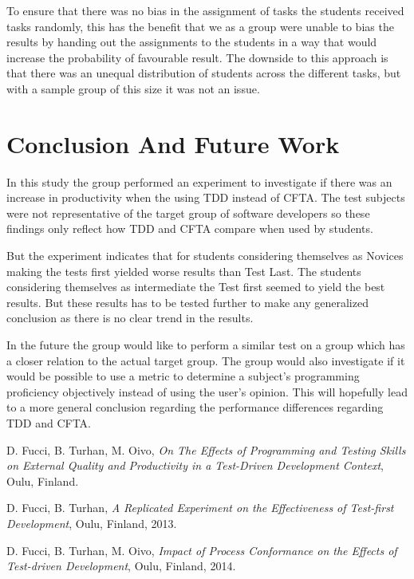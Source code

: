 \documentclass{sig-alternate-05-2015}
\begin{document}
To ensure that there was no bias in the assignment of tasks the students received tasks randomly, this has the benefit that we as a group were unable to bias the results by handing out the assignments to the students in a way that would increase the probability of favourable result. The downside to this approach is that there was an unequal distribution of students across the different tasks, but with a sample group of this size it was not an issue.

\section{Conclusion And Future Work}
In this study the group performed an experiment to investigate if there was an increase in productivity when the using TDD instead of CFTA. The test subjects were not representative of the target group of software developers so these findings only reflect how TDD and CFTA compare when used by students. 

But the experiment indicates that for students considering themselves as Novices making the tests first yielded worse results than Test Last. The students considering themselves as intermediate the Test first seemed to yield the best results. But these results has to be tested further to make any generalized conclusion as there is no clear trend in the results.

In the future the group would like to perform a similar test on a group which has a closer relation to the actual target group. The group would also investigate if it would be possible to use a metric to determine a subject's programming proficiency objectively instead of using the user's opinion. This will hopefully lead to a more general conclusion regarding the performance differences regarding TDD and CFTA.

\begin{thebibliography}{3}

  D. Fucci, B. Turhan, M. Oivo,
  \emph{On The Effects of Programming and Testing Skills on External Quality and Productivity in a Test-Driven Development Context},
  Oulu, Finland.
  
  D. Fucci, B. Turhan,
  \emph{A Replicated Experiment on the Effectiveness of Test-first Development},
  Oulu, Finland,
  2013.
  
  D. Fucci, B. Turhan, M. Oivo,
  \emph{Impact of Process Conformance on the Effects of Test-driven Development},
  Oulu, Finland,
  2014.

\end{thebibliography}
\end{document}
